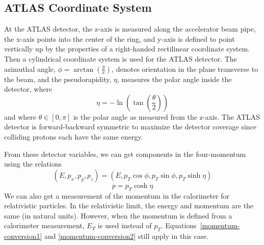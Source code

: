 \subsection{ATLAS Coordinate System}

At the ATLAS detector, the z-axis is measured along the accelerator beam pipe, the x-axis points into the center of the ring, and y-axis is defined to point vertically up by the properties of a right-handed rectilinear coordinate system.  
Then a cylindrical coordinate system is used for the ATLAS detector.
The azimuthal angle, $\phi = \arctan(\frac{y}{x})$, denotes orientation in the plane transverse to the beam, and the pseudorapidity, $\eta$, measures the polar angle inside the detector, where
%
\begin{equation}
\eta = -\ln \left( \tan \left(\frac{\theta}{2} \right) \right)
\end{equation}
%
and where $\theta \in [0,\pi]$ is the polar angle as measured from the z-axis.  The ATLAS detector is forward-backward symmetric to maximize the detector coverage since colliding protons each have the same energy.

From these detector variables, we can get components in the four-momentum using the relations %
\begin{equation}
(E,p_x, p_y, p_z) = (E,p_T \cos \phi, p_T \sin \phi,p_T \sinh \eta)
\label{momentum-conversion1}
\end{equation}
\begin{equation}
p = p_T \cosh \eta
\label{momentum-conversion2}
\end{equation}
We can also get a measurement of the momentum in the calorimeter for relativistic particles.  In the relativistic limit, the energy and momentum are the same (in natural units).  However, when the momentum is defined from a calorimeter measurement, $E_T$ is used instead of $p_T$. Equations~\eqref{momentum-conversion1} and \eqref{momentum-conversion2} still apply in this case.

